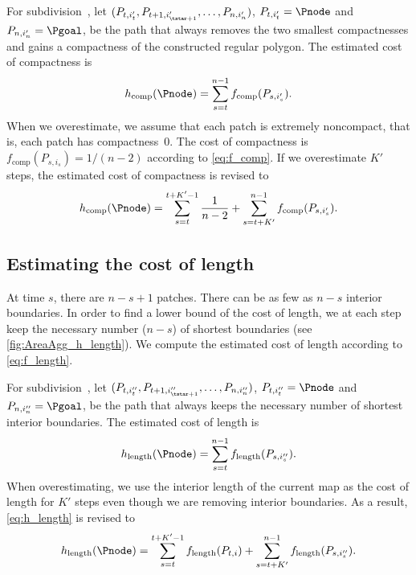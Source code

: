 For subdivision~\Pnode, let
$(P_{t,i'_t}, P_{t+1,i'_{\tstar+1}}, \dots,P_{n,i'_n})$, 
$P_{t,i'_t}=\Pnode$ and $P_{n,i'_n}=\Pgoal$,
be the path that always removes the two smallest compactnesses
and gains a compactness of the constructed regular polygon.
The estimated cost of compactness is
\begin{equation}
\label{eq:h_comp}
h_\mathrm{comp}(\Pnode)=
\sum_{s=t}^{n-1}f_\mathrm{comp}(P_{s,i'_s}).
\end{equation}
When we overestimate, 
we assume that each patch is extremely noncompact,
that is, each patch has compactness~$0$.
The cost of compactness is $f_\mathrm{comp}(P_{s,i_s})=1/(n-2)$
according to \eq\ref{eq:f_comp}.
If we overestimate $K'$ steps, 
the estimated cost of compactness is revised to
\begin{equation}
\label{eq:o_comp}
h_\mathrm{comp}(\Pnode)=
\sum_{s=t}^{t+K'-1}\frac{1}{n-2}+
\sum_{s=t+K'}^{n-1}f_\mathrm{comp}(P_{s,i'_s}).
\end{equation}



\subsection{Estimating the cost of length}
\label{sec:AreaAgg_h_length}

At time $s$, there are $n-s+1$ patches.
There can be as few as $n-s$ interior boundaries.
In order to find a lower bound of the cost of length,
we at each step keep the necessary number ($n-s$) of shortest  
boundaries
(see \fig\ref{fig:AreaAgg_h_length}).
We compute the estimated cost of length according to 
\eq\ref{eq:f_length}.

For subdivision~\Pnode, let
$(P_{t,i''_t}, P_{t+1,i''_{\tstar+1}}, \dots,P_{n,i''_n})$, 
$P_{t,i''_t}=\Pnode$ and $P_{n,i''_n}=\Pgoal$,
be the path that always keeps 
the necessary number of shortest interior boundaries.
The estimated cost of length is
\begin{equation}
\label{eq:h_length}
h_\mathrm{length}(\Pnode)=
\sum_{s=t}^{n-1}f_\mathrm{length}(P_{s,i''_s}).
\end{equation}
When overestimating,
we use the interior length of the current map as the cost of 
length for $K'$ steps even though we are removing 
interior boundaries.
As a result, \fo\ref{eq:h_length} is revised to
\begin{equation}
\label{eq:o_length}
h_\mathrm{length}(\Pnode)=
\sum_{s=t}^{t+K'-1}f_\mathrm{length}(P_{t,i})+
\sum_{s=t+K'}^{n-1}f_\mathrm{length}(P_{s,i''_s}).
\end{equation}



